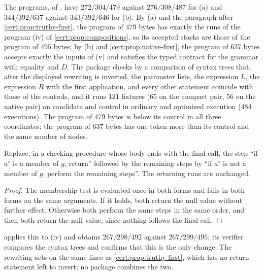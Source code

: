 The programs, of , have $272/304/479$ against
$276/308/487$ for (a) and $344/392/637$ against $343/392/646$ for (b). By
(a) and the paragraph after \cref{cert:prop:truthy-first}, the program of
$479$ bytes has exactly the runs of the program (iv) of
\cref{cert:prop:compositions}, so its accepted stacks are those of the
program of $495$ bytes; by (b) and \cref{cert:prop:native-first}, the
program of $637$ bytes accepts exactly the inputs of (v) and satisfies the
typed contract for the grammar with equality and $D$. The package checks by a
comparison of syntax trees that, after the displayed rewriting is inverted,
the parameter lists, the expression $L$, the expression $R$ with the first
application, and every other statement coincide with those of the controls,
and it runs $121$ fixtures ($65$ on the compact pair, $56$ on the native
pair) on candidate and control in ordinary and optimized execution ($484$
executions). The program of $479$ bytes is below its
control in all three coordinates; the program of $637$ bytes has one token
more than its control and the same number of nodes.

\begin{proposition}\label{cert:prop:inverted}
Replace, in a checking procedure whose body ends with the final call, the
step ``if $a^{\circ}$ is a member of $g$, return'' followed by the remaining
steps by ``if $a^{\circ}$ is not a member of $g$, perform the remaining
steps''. The returning runs are unchanged.
\end{proposition}
\begin{proof}
The membership test is evaluated once in both forms and fails in both forms
on the same arguments. If it holds, both return the null value without
further effect. Otherwise both perform the same steps in the same order, and
then both return the null value, since nothing follows the final call.
\end{proof}

 applies this to (iv) and obtains $267/298/492$
against $267/299/495$; its verifier compares the syntax trees and confirms
that this is the only change. The rewriting acts on the same lines as
\cref{cert:prop:truthy-first}, which has no return statement left to invert;
no package combines the two.

